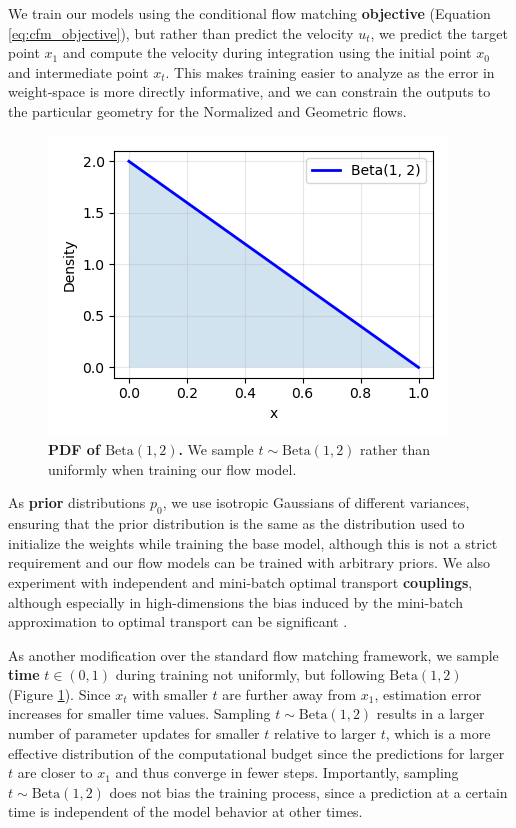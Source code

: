 We train our models using the conditional flow matching \textbf{objective} (Equation \ref{eq:cfm_objective}), but rather than predict the velocity $u_t$, we predict the target point $x_1$ and compute the velocity during integration using the initial point $x_0$ and intermediate point $x_t$.
This makes training easier to analyze as the error in weight-space is more directly informative, and we can constrain the outputs to the particular geometry for the Normalized and Geometric flows. 

\begin{figure}
    \centering
        \includegraphics[width=\linewidth]{figures/beta.png}
    \caption{\label{fig:beta}\textbf{PDF of $\text{Beta}(1,2)$.} We sample $t\sim \text{Beta}(1,2)$ rather than uniformly when training our flow model.}
\end{figure}

As \textbf{prior} distributions $p_0$, we use isotropic Gaussians of different variances, ensuring that the prior distribution is the same as the distribution used to initialize the weights while training the base model, although this is not a strict requirement and our flow models can be trained with arbitrary priors. We also experiment with independent and mini-batch optimal transport \textbf{couplings}, although especially in high-dimensions the bias induced by the mini-batch approximation to optimal transport can be significant \citep{fatrasMinibatchOptimalTransport2021}. 

As another modification over the standard flow matching framework, we sample \textbf{time} $t \in (0,1)$  during training not uniformly, but following $\text{Beta}(1,2)$ (Figure \ref{fig:beta}). Since $x_t$ with smaller $t$ are further away from $x_1$, estimation error increases for smaller time values. Sampling $t \sim \text{Beta}(1,2)$ results in a larger number of parameter updates for smaller $t$ relative to larger $t$, which is a more effective distribution of the computational budget since the predictions for larger $t$ are closer to $x_1$ and thus converge in fewer steps. Importantly, sampling $t \sim \text{Beta}(1,2)$ does not bias the training process, since a prediction at a certain time is independent of the model behavior at other times. 

